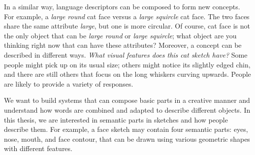 In a similar way, language descriptors can be composed to form new concepts. For example, a \textit{large round} cat face versus a \textit{large squircle} cat face. The two faces share the same attribute \textit{large}, but one is more circular. Of course, cat face is not the only object that can be \textit{large round} or \textit{large squircle}; what object are you thinking right now that can have these attributes?
Moreover, a concept can be described in different ways. \textit{What visual features does this cat sketch have?} Some people might pick up on its usual size; others might notice its slightly edged chin, and there are still others that focus on the long whiskers curving upwards. People are likely to provide a variety of responses.  

We want to build systems that can compose basic parts in a creative manner and understand how words are combined and adapted to describe different objects.  
In this thesis, we are interested in semantic parts in sketches and how people describe them. For example, a face sketch may contain four semantic parts: eyes, nose, mouth, and face contour, that can be drawn using various geometric shapes with different features.    


